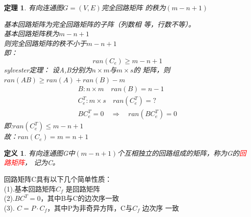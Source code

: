 \documentclass[11pt,a4paper,openany]{book}
\newcommand{\song}{\CJKfamily{song}}
\newtheorem{theorem}{\textbf{定理}}[section]
\newtheorem{defination}{\textbf{定义}}[section]
\begin{document}
\begin{theorem}
有向连通图$G=(V,E)$完全回路矩阵
的秩为$(m-n+1)$\\
{\song
基本回路矩阵为完全回路矩阵的子阵（列数相
等，行数不等）。\\
基本回路矩阵秩为$m-n+1$\\
则完全回路矩阵的秩不小于$m-n+1$\\
即：$$ran(C_e)\geq m-n+1$$
sylvester定理： 设A,B分别为$n\times m$与$m\times s$的
矩阵，则$ran (AB) \geq ran (A)+ran (B)-m$
\begin{gather*}
                                       B:n\times m \quad ran(B)=n-1 \\
                                       C_e^T:m \times s \quad ran(C_e^T)=?\\
                                       BC_e^T=0 \quad \Rightarrow \quad ran(BC_e^T)=0
                                     \end{gather*}
 即:$ran(C_e^T)\leq m-n+1$\\
 故：$ran(C_e)=m=n+1$

}
\end{theorem}
\begin{defination}
有向连通图G中$(m-n+1)$个互相独立的回路组成的矩阵，称为G的\textcolor{red}{回路矩阵}，
记为C。
\end{defination}
\begin{shaded}
\noindent 回路矩阵C具有以下几个简单性质：\\
(1).基本回路矩阵$C_f$ 是回路矩阵\\
(2).$BC^T=0$，其中B与C的边次序一致\\
(3). $C=P\cdot C_f$，其中P为非奇异方阵，C与$C_f$ 边次序
一致
\end{shaded}
\end{document}
